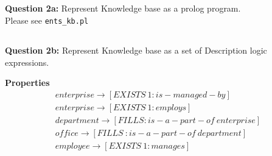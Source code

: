 \documentclass[11pt]{article}
\begin{document}
\subsection{}
\textbf{Question 2a:}
Represent Knowledge base as a prolog program. \\

Please see \texttt{ents\_kb.pl} 

\subsection{}
\textbf{Question 2b:}
Represent Knowledge base as a set of Description logic expressions.

\textbf{Properties}
\begin{align*}
	enterprise \rightarrow [EXISTS\ 1 :is-managed-by] \\
	enterprise \rightarrow [EXISTS\ 1 :employs] \\
	department \rightarrow[FILLS :is-a-part-of\ enterprise] \\
	office \rightarrow [FILLS\ :is-a-part-of\ department] \\
	employee \rightarrow [EXISTS\ 1 :manages]
\end{align*}
\end{document}

